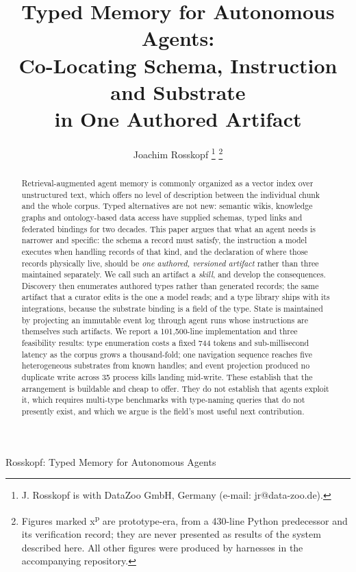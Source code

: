 \documentclass[journal,nofonttune]{IEEEtran}
\newcommand{\pn}[1]{#1\textsuperscript{\textsf{p}}}
\begin{document}
\title{Typed Memory for Autonomous Agents:\\
Co-Locating Schema, Instruction and Substrate\\
in One Authored Artifact}

\author{Joachim Rosskopf%
\thanks{J. Rosskopf is with DataZoo GmbH, Germany (e-mail:
jr@data-zoo.de).}%
\thanks{Figures marked \pn{x} are prototype-era, from a 430-line Python
predecessor and its verification record; they are never presented as results
of the system described here. All other figures were produced by harnesses in
the accompanying repository.}}

%
{Rosskopf: Typed Memory for Autonomous Agents}

\maketitle

\begin{abstract}
Retrieval-augmented agent memory is commonly organized as a vector index
over unstructured text, which offers no level of description between the
individual chunk and the whole corpus. Typed alternatives are not new: semantic
wikis, knowledge graphs and ontology-based data access have supplied schemas,
typed links and federated bindings for two decades. This paper argues that
what an agent needs is narrower and specific: the schema a record must
satisfy, the instruction a model executes when handling records of that kind,
and the declaration of where those records physically live, should be
\emph{one authored, versioned artifact} rather than three maintained
separately. We call such an artifact a \emph{skill}, and develop the
consequences. Discovery then enumerates authored types rather than generated
records; the same artifact that a curator edits is the one a model reads; and
a type library ships with its integrations, because the substrate binding is
a field of the type. State is maintained by projecting an immutable event log
through agent runs whose instructions are themselves such artifacts. We
report a 101{,}500-line implementation and three feasibility results: type
enumeration costs a fixed 744 tokens and sub-millisecond latency as the
corpus grows a thousand-fold; one navigation sequence reaches five
heterogeneous substrates from known handles; and event projection produced no
duplicate write across 35 process kills landing mid-write. These establish
that the arrangement is buildable and cheap to offer. They do not establish
that agents exploit it, which requires multi-type benchmarks with type-naming
queries that do not presently exist, and which we argue is the field's most
useful next contribution.
\end{abstract}
\end{document}
